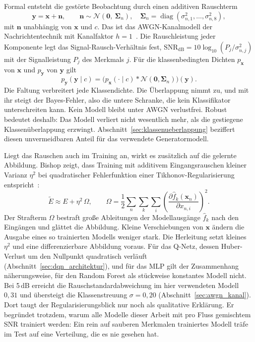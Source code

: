 Formal entsteht die gestörte Beobachtung durch einen additiven Rauschterm
\begin{equation}
	\mathbf{y}=\mathbf{x}+\mathbf{n},\qquad \mathbf{n}\sim\mathcal{N}\!\left(\mathbf{0},\ \boldsymbol{\Sigma}_n\right),\quad \boldsymbol{\Sigma}_n=\operatorname{diag}\!\left(\sigma_{n,1}^2,\dots,\sigma_{n,8}^2\right),
\end{equation}
mit $\mathbf{n}$ unabhängig von $\mathbf{x}$ und $c$. Das ist das AWGN-Kanalmodell der Nachrichtentechnik mit Kanalfaktor $h=1$~\autocite{proakisDigitalCommunications2008}. Die Rauschleistung jeder Komponente legt das Signal-Rausch-Verhältnis fest, $\mathrm{SNR_{dB}}=10\log_{10}\!\left(P_j/\sigma_{n,j}^2\right)$ mit der Signalleistung $P_j$ des Merkmals $j$. Für die klassenbedingten Dichten $p_{\mathbf{x}}$ von $\mathbf{x}$ und $p_{\mathbf{y}}$ von $\mathbf{y}$ gilt
\begin{equation}
	p_{\mathbf{y}}(\mathbf{y}\mid c)=\bigl(p_{\mathbf{x}}(\cdot\mid c)*\mathcal{N}(\mathbf{0},\boldsymbol{\Sigma}_n)\bigr)(\mathbf{y}).
\end{equation}
Die Faltung verbreitert jede Klassendichte. Die Überlappung nimmt zu, und mit ihr steigt der Bayes-Fehler, also die untere Schranke, die kein Klassifikator unterschreiten kann. Kein Modell bleibt unter AWGN verlustfrei. Robust bedeutet deshalb: Das Modell verliert nicht wesentlich mehr, als die gestiegene Klassenüberlappung erzwingt. Abschnitt~\ref{sec:klassenueberlappung} beziffert diesen unvermeidbaren Anteil für das verwendete Generatormodell.

Liegt das Rauschen auch im Training an, wirkt es zusätzlich auf die gelernte Abbildung. Bishop zeigt, dass Training mit additivem Eingangsrauschen kleiner Varianz $\eta^2$ bei quadratischer Fehlerfunktion einer Tikhonov-Regularisierung entspricht~\autocite{bishopTrainingNoiseEquivalent1995}:
\begin{equation}
	\tilde{E}\approx E+\eta^{2}\,\Omega,\qquad \Omega=\frac{1}{2}\sum_{n}\sum_{k}\sum_{i}\left(\frac{\partial \hat{f}_k(\mathbf{x}_n)}{\partial x_{n,i}}\right)^{2}.
\end{equation}
Der Strafterm $\Omega$ bestraft große Ableitungen der Modellausgänge $\hat{f}_k$ nach den Eingängen und glättet die Abbildung. Kleine Verschiebungen von $\mathbf{x}$ ändern die Ausgabe eines so trainierten Modells weniger stark. Die Herleitung setzt kleines $\eta^2$ und eine differenzierbare Abbildung voraus. Für das Q-Netz, dessen Huber-Verlust um den Nullpunkt quadratisch verläuft (Abschnitt~\ref{sec:dqn_architektur}), und für das MLP gilt der Zusammenhang näherungsweise, für den Random Forest als stückweise konstantes Modell nicht. Bei 5\,dB erreicht die Rauschstandardabweichung im hier verwendeten Modell $0{,}31$ und übersteigt die Klassenstreuung $\sigma=0{,}20$ (Abschnitt~\ref{sec:awgn_kanal}). Dort taugt der Regularisierungsblick nur noch als qualitative Erklärung. Er begründet trotzdem, warum alle Modelle dieser Arbeit mit pro Fluss gemischtem SNR trainiert werden: Ein rein auf sauberen Merkmalen trainiertes Modell träfe im Test auf eine Verteilung, die es nie gesehen hat.

